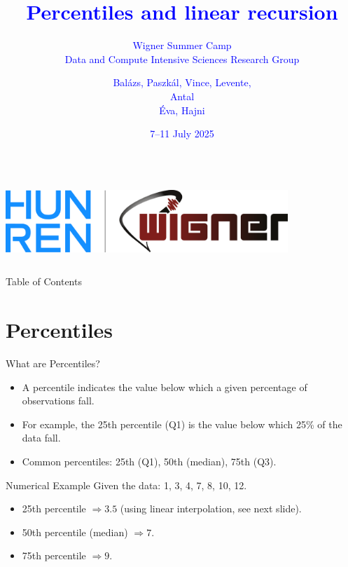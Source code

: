 \documentclass{beamer}
\title{\textcolor{blue}{Percentiles and linear recursion}}
\subtitle{\textcolor{blue}{Wigner Summer Camp \\ Data and Compute Intensive Sciences Research Group}}
\author{\textcolor{blue}{Bal\'azs, Paszk\'al, Vince, Levente, \\ Antal \\ \'Eva, Hajni}}
\date{\textcolor{blue}{7--11 July 2025}}
\begin{document}
\begin{frame}
  \titlepage

  \begin{columns}
    \centering
    \includegraphics[width=0.8\textwidth]{img/logo.png}
  \end{columns}
\end{frame}

\begin{frame}{Table of Contents}
  \tableofcontents
\end{frame}

\section{Percentiles}
\begin{frame}{What are Percentiles?}
\begin{itemize}
  \item A percentile indicates the value below which a given percentage of observations fall.
  \item For example, the 25th percentile (Q1) is the value below which 25\% of the data fall.
  \item Common percentiles: 25th (Q1), 50th (median), 75th (Q3).
\end{itemize}
\end{frame}

\begin{frame}{Numerical Example}
Given the data: 1, 3, 4, 7, 8, 10, 12.
\begin{itemize}
  \item 25th percentile \( \Rightarrow 3.5 \) (using linear interpolation, see next slide).
  \item 50th percentile (median) \( \Rightarrow 7 \).
  \item 75th percentile \( \Rightarrow 9 \).
\end{itemize}
\end{frame}
\end{document}
